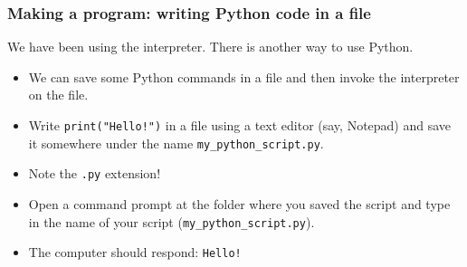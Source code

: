 \documentclass[notes]{beamer}
\begin{document}
	\begin{frame}[fragile]
		\frametitle{Making a program: writing Python code in a file}
		We have been using the interpreter. There is another way to use Python.
		\begin{itemize}
			\item We can save some Python commands in a file and then invoke the interpreter on the file.
			\pause
			\item Write \colorbox{codebg}{\lstinline|print("Hello!")|} in a file using a text editor (say, Notepad) and save it somewhere under the name \lstinline|my_python_script.py|.
			\item Note the \lstinline|.py| extension!
			\pause
			\item Open a command prompt at the folder where you saved the script and type in the name of your script (\lstinline|my_python_script.py|).
			\item The computer should respond: \lstinline|Hello!|
		\end{itemize}
	\end{frame}

	
\end{document}
